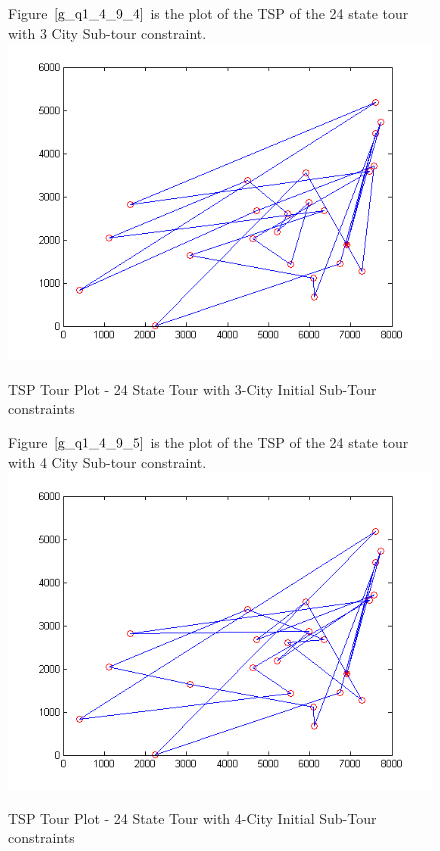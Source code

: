 \documentclass[twoside,12pt]{article}
\begin{document}
\begin{figure}[!htbp]
\centering
Figure $\eqref{g_q1_4_9_4}$ is the plot of the TSP of the 24 state tour with 3 City Sub-tour constraint. 
 \includegraphics[scale=1.2]{3_city/all_24_with_3} 
\caption{TSP Tour Plot - 24 State Tour with 3-City Initial Sub-Tour constraints}
\label{g_q1_4_9_4}
\end{figure}
\FloatBarrier


\begin{figure}[!htbp]
\centering
Figure $\eqref{g_q1_4_9_5}$ is the plot of the TSP of the 24 state tour with 4 City Sub-tour constraint. 
 \includegraphics[scale=1.2]{4_city/all_24_with_4} 
\caption{TSP Tour Plot - 24 State Tour with 4-City Initial Sub-Tour constraints}
\label{g_q1_4_9_5}
\end{figure}
\FloatBarrier
\end{document}
